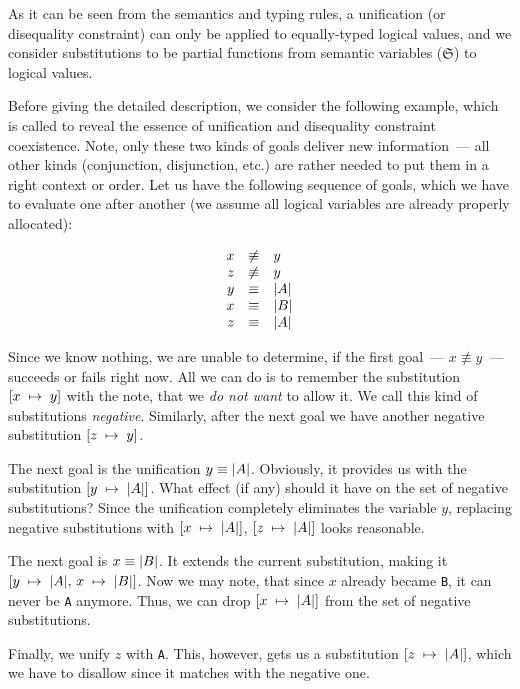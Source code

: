 As it can be seen from the semantics and typing rules, a unification (or disequality constraint) can only
be applied to equally-typed logical values, and we consider substitutions to be partial functions from
semantic variables ($\mathfrak S$) to logical values.

Before giving the detailed description, we consider the following example, which is called to reveal the essence of unification and
disequality constraint coexistence. Note, only these two kinds of goals deliver new information~--- all other kinds (conjunction, disjunction, etc.) are rather needed to
put them in a right context or order. Let us have the following sequence of goals, which we have to evaluate one after another (we assume all logical 
variables are already properly allocated):

$$
\def\arraystretch{1}
\begin{array}{rcl}
x&\not\equiv&y\\
z&\not\equiv&y\\
y&\equiv&\lstinline|A|\\
x&\equiv&\lstinline|B|\\
z&\equiv&\lstinline|A|
\end{array}
$$

Since we know nothing, we are unable to determine, if the first goal~--- \mbox{$x\not\equiv y$}~--- succeeds or fails right now. All we can do is to
remember the substitution \mbox{$[x\;\mapsto\; y]$} with the note, that we \emph{do not want} to allow it. We call this kind of substitutions \emph{negative}. Similarly,
after the next goal we have another negative substitution \mbox{$[z\;\mapsto\; y]$}. 

The next goal is the unification \mbox{$y\equiv\lstinline|A|$}. Obviously, it provides us with the substitution \mbox{$[y\binds\lstinline|A|]$}. What effect (if any)
should it have on the set of negative substitutions? Since the unification completely eliminates the variable $y$, replacing negative substitutions with
\mbox{$[x\binds\lstinline|A|]$}, \mbox{$[z\binds\lstinline|A|]$} looks reasonable.

The next goal is \mbox{$x\equiv\lstinline|B|$}. It extends the current substitution, making it \mbox{$[y\binds\lstinline|A|,\,x\binds\lstinline|B|]$}. Now we may
note, that since $x$ already became \lstinline|B|, it can never be \lstinline|A| anymore. Thus, we can drop \mbox{$[x\binds\lstinline|A|]$} from the set of
negative substitutions.

Finally, we unify $z$ with \lstinline|A|. This, however, gets us a substitution \mbox{$[z\binds\lstinline|A|]$}, which we have to disallow since it
matches with the negative one.

